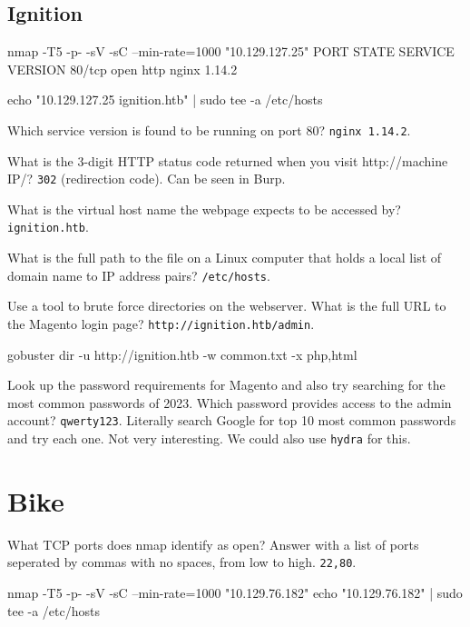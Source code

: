\documentclass[a4paper,10pt]{article}
\begin{document}
\subsection{Ignition \faLinux}

\begin{bash}
nmap -T5 -p- -sV -sC --min-rate=1000 "10.129.127.25"
PORT   STATE SERVICE VERSION
80/tcp open  http    nginx 1.14.2
\end{bash}
\begin{bash}
echo "10.129.127.25  ignition.htb" | sudo tee -a /etc/hosts
\end{bash}

Which service version is found to be running on port 80? \texttt{nginx 1.14.2}.

What is the 3-digit HTTP status code returned when you visit http://{machine IP}/? \texttt{302} (redirection code). Can be seen in Burp.

What is the virtual host name the webpage expects to be accessed by? \texttt{ignition.htb}.

What is the full path to the file on a Linux computer that holds a local list of domain name to IP address pairs? \texttt{/etc/hosts}.

Use a tool to brute force directories on the webserver. What is the full URL to the Magento login page? \texttt{http://ignition.htb/admin}.
\begin{bash}
gobuster dir -u http://ignition.htb -w common.txt -x php,html
\end{bash}

Look up the password requirements for Magento and also try searching for the most common passwords of 2023. Which password provides access to the admin account? \texttt{qwerty123}. Literally search Google for top 10 most common passwords and try each one. Not very interesting. We could also use \texttt{hydra} for this.

\section{Bike \faLinux}

 What TCP ports does nmap identify as open? Answer with a list of ports seperated by commas with no spaces, from low to high. \texttt{22,80}.
\begin{bash}
nmap -T5 -p- -sV -sC --min-rate=1000 "10.129.76.182"
echo "10.129.76.182" | sudo tee -a /etc/hosts
\end{bash}
\end{document}
